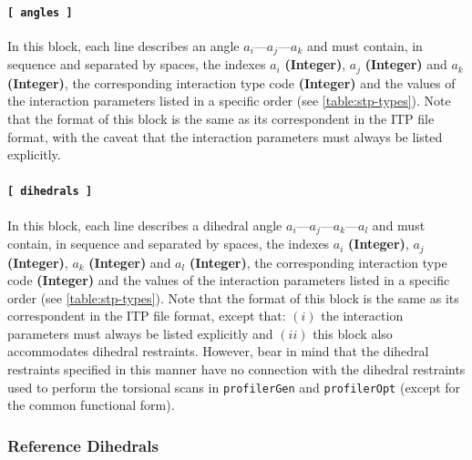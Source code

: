 \documentclass[10pt,a4paper,openany]{memoir}
\numberwithin{equation}{section}
\newcommand{\profileropt}[0]{\texttt{profilerOpt}}
\newcommand{\profilergen}[0]{\texttt{profilerGen}}
\begin{document}
\paragraph{\texttt{[~angles~]}}

In this block, each line describes an angle $a_i$---$a_j$---$a_k$ and
must contain, in sequence and separated by spaces, the indexes $a_i$
\textbf{(Integer)}, $a_j$ \textbf{(Integer)} and $a_k$
\textbf{(Integer)}, the corresponding interaction type code
\textbf{(Integer)} and the values of the interaction parameters listed
in a specific order (see \autoref{table:stp-types}). Note that the
format of this block is the same as its correspondent in the ITP file
format, with the caveat that the interaction parameters must always be
listed explicitly.

\paragraph{\texttt{[~dihedrals~]}}

In this block, each line describes a dihedral angle
$a_i$---$a_j$---$a_k$---$a_l$ and must contain, in sequence and
separated by spaces, the indexes $a_i$ \textbf{(Integer)}, $a_j$
\textbf{(Integer)}, $a_k$ \textbf{(Integer)} and $a_l$
\textbf{(Integer)}, the corresponding interaction type code
\textbf{(Integer)} and the values of the interaction parameters listed
in a specific order (see \autoref{table:stp-types}). Note that the
format of this block is the same as its correspondent in the ITP file
format, except that: $(i)$ the interaction parameters must always be
listed explicitly and $(ii)$ this block also accommodates dihedral
restraints.
%
However, bear in mind that the dihedral restraints specified in this
manner have no connection with the dihedral restraints used to perform
the torsional scans in \profilergen{} and \profileropt{} (except for
the common functional form).


\subsubsection{Reference Dihedrals}
\label{sec:stp-ref_dihedral}
\end{document}
